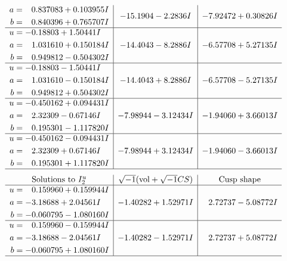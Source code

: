 \documentclass[1p]{elsarticle_modified}
\theoremstyle{definition}
\newcommand{\I}{\sqrt{-1}}
\begin{document}
$$\begin{array}{c|c|c}
\begin{aligned}
a &= \phantom{-}0.837083 + 0.103955 I \\
b &= \phantom{-}0.840396 + 0.765707 I\end{aligned}
 & -15.1904 - 2.2836 I & -7.92472 + 0.30826 I \\ \hline\begin{aligned}
u &= -0.18803 + 1.50441 I \\
a &= \phantom{-}1.031610 + 0.150184 I \\
b &= \phantom{-}0.949812 - 0.504302 I\end{aligned}
 & -14.4043 - 8.2886 I & -6.57708 + 5.27135 I \\ \hline\begin{aligned}
u &= -0.18803 - 1.50441 I \\
a &= \phantom{-}1.031610 - 0.150184 I \\
b &= \phantom{-}0.949812 + 0.504302 I\end{aligned}
 & -14.4043 + 8.2886 I & -6.57708 - 5.27135 I \\ \hline\begin{aligned}
u &= -0.450162 + 0.094431 I \\
a &= \phantom{-}2.32309 - 0.67146 I \\
b &= \phantom{-}0.195301 - 1.117820 I\end{aligned}
 & -7.98944 - 3.12434 I & -1.94060 + 3.66013 I \\ \hline\begin{aligned}
u &= -0.450162 - 0.094431 I \\
a &= \phantom{-}2.32309 + 0.67146 I \\
b &= \phantom{-}0.195301 + 1.117820 I\end{aligned}
 & -7.98944 + 3.12434 I & -1.94060 - 3.66013 I\\
 \hline 
 \end{array}$$\newpage$$\begin{array}{c|c|c}  
\text{Solutions to }I^u_{2}& \I (\text{vol} + \sqrt{-1}CS) & \text{Cusp shape}\\
 \hline 
\begin{aligned}
u &= \phantom{-}0.159960 + 0.159944 I \\
a &= -3.18688 + 2.04561 I \\
b &= -0.060795 - 1.080160 I\end{aligned}
 & -1.40282 + 1.52971 I & \phantom{-}2.72737 - 5.08772 I \\ \hline\begin{aligned}
u &= \phantom{-}0.159960 - 0.159944 I \\
a &= -3.18688 - 2.04561 I \\
b &= -0.060795 + 1.080160 I\end{aligned}
 & -1.40282 - 1.52971 I & \phantom{-}2.72737 + 5.08772 I\\
 \hline 
 \end{array}$$\newpage\newpage\renewcommand{\arraystretch}{1}
\end{document}
